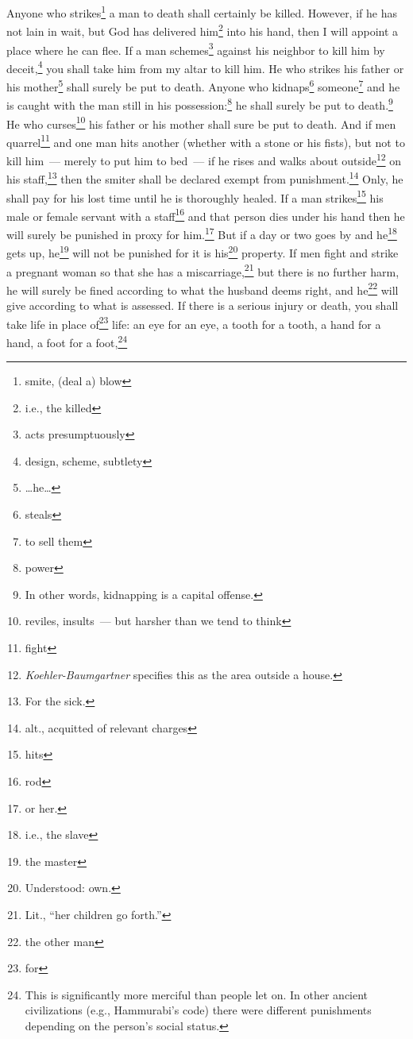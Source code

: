 \begin{enumerate}[align=center]
     Anyone who strikes\footnote{smite, (deal a) blow} a man to death shall certainly be killed.%
     However, if he has not lain in wait, but God has delivered him\footnote{i.e., the killed} into his hand, then I will appoint a place where he can flee.%
     If a man schemes\footnote{acts presumptuously} against his neighbor to kill him by deceit,\footnote{design, scheme, subtlety} you shall take him from my altar to kill him.%
     He who strikes his father or his mother\footnote{\dots he\dots} shall surely be put to death.%
     Anyone who kidnaps\footnote{steals} someone\footnote{to sell them} and he is caught with the man still in his possession:\footnote{power} he shall surely be put to death.\footnote{In other words, kidnapping is a capital offense.}%
     He who curses\footnote{reviles, insults~--- but harsher than we tend to think} his father or his mother shall sure be put to death.%
     And if men quarrel\footnote{fight} and one man hits another (whether with a stone or his fists), but not to kill him~--- merely to put him to bed~---%
     if he rises and walks about outside\footnote{\textit{Koehler-Baumgartner} specifies this as the area outside a house.} on his staff,\footnote{For the sick.} then the smiter shall be declared exempt from punishment.\footnote{alt., acquitted of relevant charges} Only, he shall pay for his lost time until he is thoroughly healed.%
     If a man strikes\footnote{hits} his male or female servant with a staff\footnote{rod} and that person dies under his hand then he will surely be punished in proxy for him.\footnote{or her.}%
     But if a day or two goes by and he\footnote{i.e., the slave} gets up, he\footnote{the master} will not be punished for it is his\footnote{Understood: own.} property.%
     If men fight and strike a pregnant woman so that she has a miscarriage,\footnote{Lit., ``her children go forth.''} but there is no further harm, he will surely be fined according to what the husband deems right, and he\footnote{the other man} will give according to what is assessed.%
     If there is a serious injury or death, you shall take life in place of\footnote{for} life:%
     an eye for an eye, a tooth for a tooth, a hand for a hand, a foot for a foot,\footnote{This is significantly more merciful than people let on. In other ancient civilizations (e.g., Hammurabi's code) there were different punishments depending on the person's social status.}%

\end{enumerate}
